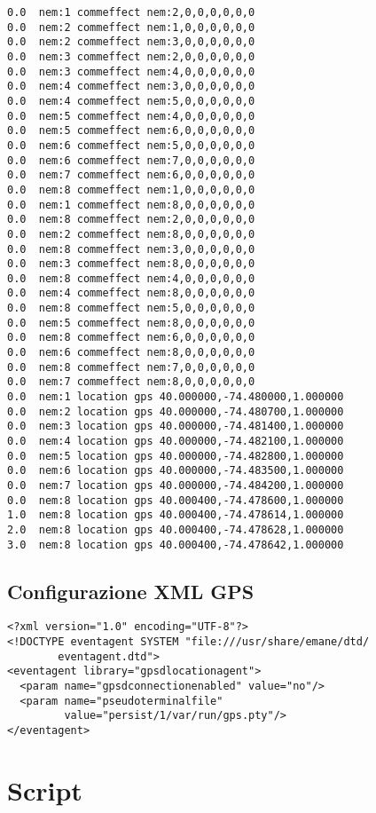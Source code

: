 \lstset{language=BASH}
\begin{lstlisting}
0.0  nem:1 commeffect nem:2,0,0,0,0,0,0
0.0  nem:2 commeffect nem:1,0,0,0,0,0,0
0.0  nem:2 commeffect nem:3,0,0,0,0,0,0
0.0  nem:3 commeffect nem:2,0,0,0,0,0,0
0.0  nem:3 commeffect nem:4,0,0,0,0,0,0
0.0  nem:4 commeffect nem:3,0,0,0,0,0,0
0.0  nem:4 commeffect nem:5,0,0,0,0,0,0
0.0  nem:5 commeffect nem:4,0,0,0,0,0,0
0.0  nem:5 commeffect nem:6,0,0,0,0,0,0
0.0  nem:6 commeffect nem:5,0,0,0,0,0,0
0.0  nem:6 commeffect nem:7,0,0,0,0,0,0
0.0  nem:7 commeffect nem:6,0,0,0,0,0,0
0.0  nem:8 commeffect nem:1,0,0,0,0,0,0
0.0  nem:1 commeffect nem:8,0,0,0,0,0,0
0.0  nem:8 commeffect nem:2,0,0,0,0,0,0
0.0  nem:2 commeffect nem:8,0,0,0,0,0,0
0.0  nem:8 commeffect nem:3,0,0,0,0,0,0
0.0  nem:3 commeffect nem:8,0,0,0,0,0,0
0.0  nem:8 commeffect nem:4,0,0,0,0,0,0
0.0  nem:4 commeffect nem:8,0,0,0,0,0,0
0.0  nem:8 commeffect nem:5,0,0,0,0,0,0
0.0  nem:5 commeffect nem:8,0,0,0,0,0,0
0.0  nem:8 commeffect nem:6,0,0,0,0,0,0
0.0  nem:6 commeffect nem:8,0,0,0,0,0,0
0.0  nem:8 commeffect nem:7,0,0,0,0,0,0
0.0  nem:7 commeffect nem:8,0,0,0,0,0,0
0.0  nem:1 location gps 40.000000,-74.480000,1.000000
0.0  nem:2 location gps 40.000000,-74.480700,1.000000
0.0  nem:3 location gps 40.000000,-74.481400,1.000000
0.0  nem:4 location gps 40.000000,-74.482100,1.000000
0.0  nem:5 location gps 40.000000,-74.482800,1.000000
0.0  nem:6 location gps 40.000000,-74.483500,1.000000
0.0  nem:7 location gps 40.000000,-74.484200,1.000000
0.0  nem:8 location gps 40.000400,-74.478600,1.000000
1.0  nem:8 location gps 40.000400,-74.478614,1.000000
2.0  nem:8 location gps 40.000400,-74.478628,1.000000
3.0  nem:8 location gps 40.000400,-74.478642,1.000000
\end{lstlisting}

\section{Configurazione XML GPS}
\label{app:gps}

\lstset{language=XML}
\begin{lstlisting}
<?xml version="1.0" encoding="UTF-8"?>
<!DOCTYPE eventagent SYSTEM "file:///usr/share/emane/dtd/
		eventagent.dtd">
<eventagent library="gpsdlocationagent">
  <param name="gpsdconnectionenabled" value="no"/>
  <param name="pseudoterminalfile"
         value="persist/1/var/run/gps.pty"/>
</eventagent>
\end{lstlisting}

\chapter{Script}
\label{app:script}

